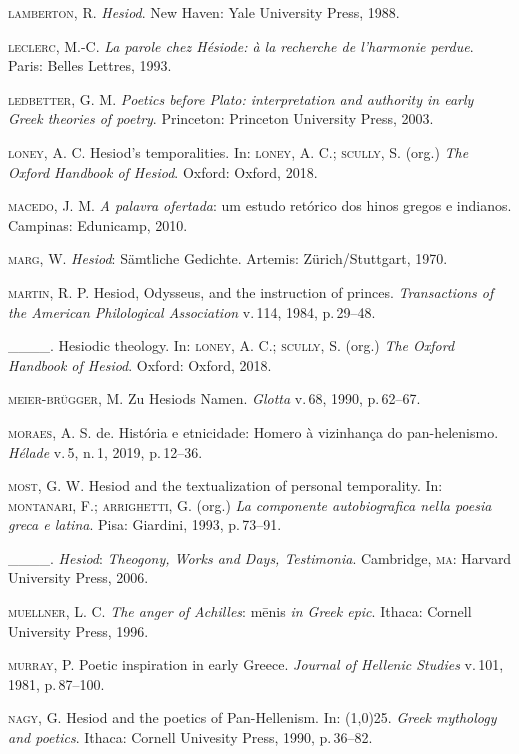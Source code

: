 \textsc{lamberton}, R. \textit{Hesiod}. New Haven: Yale University Press, 1988.

\textsc{leclerc}, M.-C. \textit{La parole chez Hésiode: à la recherche de
l'harmonie perdue}. Paris: Belles Lettres, 1993.

\textsc{ledbetter}, G. M. \textit{Poetics before Plato: interpretation and
authority in early Greek theories of poetry}. Princeton: Princeton
University Press, 2003.

\textsc{loney}, A. C. Hesiod's temporalities. In: \textsc{loney}, A. C.; \textsc{scully}, S. (org.)
\textit{The Oxford Handbook of Hesiod}. Oxford: Oxford, 2018.

\textsc{macedo}, J. M. \textit{A palavra ofertada}: um estudo retórico dos hinos
gregos e indianos. Campinas: Edunicamp, 2010.

\textsc{marg}, W. \textit{Hesiod}: Sämtliche Gedichte. Artemis: Zürich/Stuttgart,
1970.

\textsc{martin}, R. P. Hesiod, Odysseus, and the instruction of princes.
\textit{Transactions of the American Philological Association} v.\,114,
1984, p.\,29--48.

\_\_\_\_. Hesiodic theology. In: \textsc{loney}, A. C.; \textsc{scully}, S. (org.) \textit{The
Oxford Handbook of Hesiod}. Oxford: Oxford, 2018.

\textsc{meier-brügger}, M. Zu Hesiods Namen. \textit{Glotta} v.\,68, 1990, p.\,62--67.

\textsc{moraes}, A. S. de. História e etnicidade: Homero à vizinhança do
pan-helenismo. \textit{Hélade} v.\,5, n.\,1, 2019, p.\,12--36.

\textsc{most}, G. W. Hesiod and the textualization of personal temporality. In:
\textsc{montanari}, F.; \textsc{arrighetti}, G. (org.) \textit{La componente autobiografica
nella poesia greca e latina}. Pisa: Giardini, 1993, p.\,73--91.

\_\_\_\_. \textit{Hesiod}: \textit{Theogony, Works and Days, Testimonia}.
Cambridge, \textsc{ma}: Harvard University Press, 2006.

\textsc{muellner}, L. C. \textit{The anger of Achilles}: mēnis \textit{in Greek
epic}. Ithaca: Cornell University Press, 1996.

\textsc{murray}, P. Poetic inspiration in early Greece. \textit{Journal of Hellenic
Studies} v.\,101, 1981, p.\,87--100.

\textsc{nagy}, G. Hesiod and the poetics of Pan-Hellenism. In: \line(1,0){25}. \textit{Greek
mythology and poetics}. Ithaca: Cornell Univesity Press, 1990, p.\,36--82.

